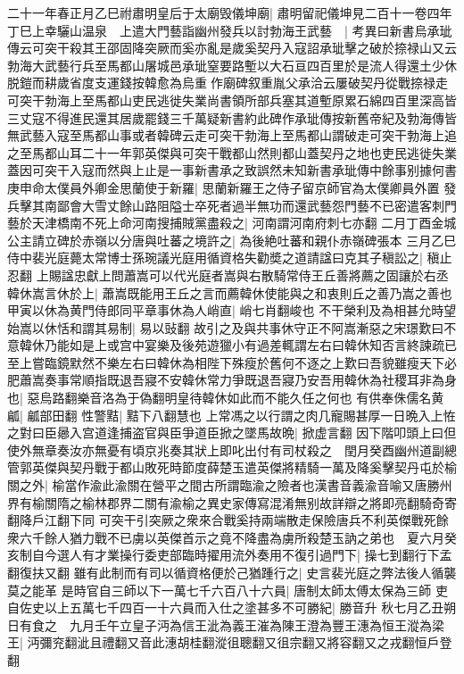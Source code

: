 二十一年春正月乙巳祔肅明皇后于太廟毁儀坤廟|{
	肅明留祀儀坤見二百十一卷四年}
丁巳上幸驪山温泉　上遣大門藝詣幽州發兵以討勃海王武藝　|{
	考異曰新書烏承玼傳云可突干殺其王邵固降突厥而奚亦亂是歲奚契丹入寇詔承玼擊之破於捺禄山又云勃海大武藝行兵至馬都山屠城邑承玼窒要路塹以大石亘四百里於是流人得還土少休脱鎧而耕歲省度支運錢按韓愈為烏重作廟碑叙重胤父承洽云屢破契丹從戰捺禄走可突干勃海上至馬都山吏民逃徙失業尚書領所部兵塞其道塹原累石綿四百里深高皆三丈寇不得進民還其居歲罷錢三千萬疑新書約此碑作承玼傳按新舊帝紀及勃海傳皆無武藝入寇至馬都山事或者韓碑云走可突干勃海上至馬都山謂破走可突干勃海上追之至馬都山耳二十一年郭英傑與可突干戰都山然則都山蓋契丹之地也吏民逃徙失業蓋因可突干入寇而然與上止是一事新書承之致誤然未知新書承玼傳中餘事别據何書}
庚申命太僕員外卿金思蘭使于新羅|{
	思蘭新羅王之侍子留京師官為太僕卿員外置}
發兵擊其南鄙會大雪丈餘山路阻隘士卒死者過半無功而還武藝怨門藝不已密遣客刺門藝於天津橋南不死上命河南搜捕賊黨盡殺之|{
	河南謂河南府刺七亦翻}
二月丁酉金城公主請立碑於赤嶺以分唐與吐蕃之境許之|{
	為後絶吐蕃和親仆赤嶺碑張本}
三月乙巳侍中裴光庭薨太常博士孫琬議光庭用循資格失勸奬之道請諡曰克其子稹訟之|{
	稹止忍翻}
上賜諡忠獻上問蕭嵩可以代光庭者嵩與右散騎常侍王丘善將薦之固讓於右丞韓休嵩言休於上|{
	蕭嵩既能用王丘之言而薦韓休使能與之和衷則丘之善乃嵩之善也}
甲寅以休為黄門侍郎同平章事休為人峭直|{
	峭七肖翻峻也}
不干榮利及為相甚允時望始嵩以休恬和謂其易制|{
	易以䜴翻}
故引之及與共事休守正不阿嵩漸惡之宋璟歎曰不意韓休乃能如是上或宫中宴樂及後苑遊獵小有過差輒謂左右曰韓休知否言終諫疏已至上嘗臨鏡默然不樂左右曰韓休為相陛下殊瘦於舊何不逐之上歎曰吾貌雖瘦天下必肥蕭嵩奏事常順指既退吾寢不安韓休常力爭既退吾寢乃安吾用韓休為社稷耳非為身也|{
	惡烏路翻樂音洛為于偽翻明皇待韓休如此而不能久任之何也}
有供奉侏儒名黄㼐|{
	㼐部田翻}
性警黠|{
	黠下八翻慧也}
上常馮之以行謂之肉几寵賜甚厚一日晩入上恠之對曰臣曏入宫道逢捕盗官與臣爭道臣掀之墜馬故晩|{
	掀虚言翻}
因下階叩頭上曰但使外無章奏汝亦無憂有頃京兆奏其狀上即叱出付有司杖殺之　閏月癸酉幽州道副總管郭英傑與契丹戰于都山敗死時節度薛楚玉遣英傑將精騎一萬及降奚擊契丹屯於榆關之外|{
	榆當作渝此渝關在營平之間古所謂臨渝之險者也漢書音義渝音喻又唐勝州界有榆關隋之榆林郡界二關有渝榆之異史家傳寫混淆無别故詳辯之將即亮翻騎奇寄翻降戶江翻下同}
可突干引突厥之衆來合戰奚持兩端散走保險唐兵不利英傑戰死餘衆六千餘人猶力戰不已虜以英傑首示之竟不降盡為虜所殺楚玉訥之弟也　夏六月癸亥制自今選人有才業操行委吏部臨時擢用流外奏用不復引過門下|{
	操七到翻行下孟翻復扶又翻}
雖有此制而有司以循資格便於己猶踵行之|{
	史言裴光庭之弊法後人循襲莫之能革}
是時官自三師以下一萬七千六百八十六員|{
	唐制太師太傅太保為三師}
吏自佐史以上五萬七千四百一十六員而入仕之塗甚多不可勝紀|{
	勝音升}
秋七月乙丑朔日有食之　九月壬午立皇子沔為信王泚為義王漼為陳王澄為豐王潓為恒王漎為梁王|{
	沔彌兖翻泚且禮翻又音此潓胡桂翻漎徂聰翻又徂宗翻又將容翻又之戎翻恒戶登翻}
